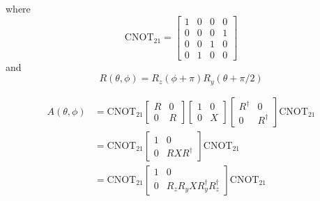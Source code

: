 \documentclass[11pt, oneside]{article}   	%
\begin{document}
where 
\begin{equation}
\mathrm{CNOT}_{21} = 
\begin{bmatrix}
1 & 0 & 0 & 0 \\
0 & 0 & 0 & 1 \\
0 & 0 & 1 & 0 \\
0 & 1 & 0 & 0
\end{bmatrix}
\end{equation}
and 
\begin{equation}
R(\theta, \phi) = R_z (\phi + \pi) R_y (\theta + \pi/2) 
\end{equation}

\begin{align}
A(\theta, \phi) 
&= \mathrm{CNOT}_{21} 
\begin{bmatrix}
R & 0 \\
0 & R
\end{bmatrix}
\begin{bmatrix}
1 & 0 \\
0 & X
\end{bmatrix}
\begin{bmatrix}
R^{\dagger} & 0 \\
0 & R^{\dagger}
\end{bmatrix}
\mathrm{CNOT}_{21} \\
&= \mathrm{CNOT}_{21} 
\begin{bmatrix}
1 & 0 \\
0 & R X R^{\dagger}
\end{bmatrix}
\mathrm{CNOT}_{21} \\
&= \mathrm{CNOT}_{21}
\begin{bmatrix}
1 & 0 \\
0 & R_z R_y X R^{\dagger}_y R^{\dagger}_z
\end{bmatrix}
\mathrm{CNOT}_{21} 
\end{align}
\end{document}
